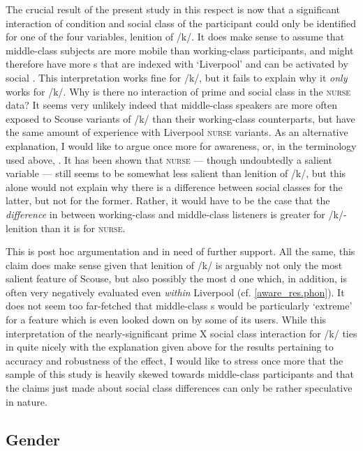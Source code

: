 The crucial result of the present study in this respect is now that a significant interaction of  condition and social class of the participant could only be identified for one of the four variables, lenition of /k/.
It does make sense to assume that middle-class subjects are more mobile than working-class participants, and might therefore have more s that are indexed with `Liverpool' and can be activated by social .
This interpretation works fine for /k/, but it fails to explain why it \emph{only} works for /k/.
Why is there no interaction of prime and social class in the \textsc{nurse} data?
It seems very unlikely indeed that middle-class speakers are more often exposed to Scouse variants of /k/ than their working-class counterparts, but have the same amount of experience with Liverpool \textsc{nurse} variants.
As an alternative explanation, I would like to argue once more for awareness, or, in the terminology used above, .
It has been shown that \textsc{nurse} --- though undoubtedly a salient variable --- still seems to be somewhat less salient than lenition of /k/, but this alone would not explain why there is a difference between social classes for the latter, but not for the former.
Rather, it would have to be the case that the \emph{difference} in  between working-class and middle-class listeners is greater for /k/-lenition than it is for \textsc{nurse}.

This is post hoc argumentation and in need of further support.
All the same, this claim does make sense given that lenition of /k/ is arguably not only the most salient feature of Scouse, but also possibly the most d one which, in addition, is often very negatively evaluated even \emph{within} Liverpool (cf. \ref{aware_res.phon}).
It does not seem too far-fetched that middle-class s would be particularly `extreme' for a feature which is even looked down on by some of its users.
While this interpretation of the nearly-significant prime X social class interaction for /k/ ties in quite nicely with the explanation given above for the results pertaining to accuracy and robustness of the  effect, I would like to stress once more that the sample of this study is heavily skewed towards middle-class participants and that the claims just made about social class differences can only be rather speculative in nature.

		\subsection{Gender}

